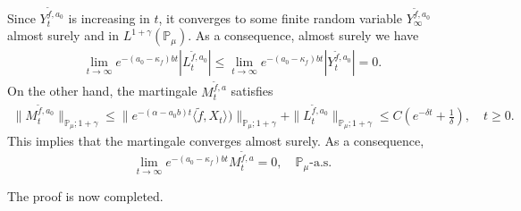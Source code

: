\documentclass[12pt,a4paper]{amsart}
\theoremstyle{plain}
\theoremstyle{definition}
\numberwithin{equation}{section}
\begin{document}
Since $Y_t^{\tilde{f},a_0}$ is increasing in $t$, it converges to some finite random variable $Y_{\infty}^{\tilde{f},a_0}$ almost surely and in $L^{1+\gamma}(\mathbb{P}_{\mu})$.
	As a consequence, almost surely we have
\begin{align*}
    \lim_{t\rightarrow \infty}e^{-(a_0 - \kappa_f)bt}|L_t^{\tilde{f},a_0}|
    \leq  \lim_{t\rightarrow \infty}e^{-(a_0 - \kappa_f)bt}|Y_t^{\tilde{f},a_0}|=0.
\end{align*}
	On the other hand, the martingale $M_t^{\tilde{f},a}$ satisfies
\begin{align*}
    \|M_t^{\tilde{f},a_0}\|_{\mathbb{P}_{\mu};1+\gamma}\leq  \|e^{-(\alpha-a_0 b)t}\langle \tilde{f},X_t\rangle)\|_{\mathbb{P}_{\mu};1+\gamma}+\|L_t^{\tilde{f},a_0}\|_{\mathbb{P}_{\mu};1+\gamma}\leq C(e^{-\delta t}+\frac{1}{\delta}),\quad t\geq 0.
\end{align*}
	This implies that the martingale converges almost surely.
	As a consequence,
\[
	\lim_{t\rightarrow\infty} e^{-(a_0-\kappa_f)bt}M_t^{\tilde{f},a}
	=0,
	\quad \mathbb P_\mu\text{-a.s.}
\]
	
	The proof is now completed.
\end{document}
